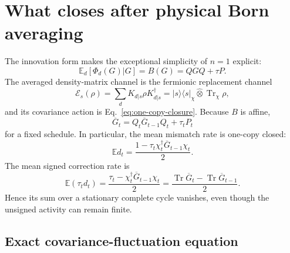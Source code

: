 \documentclass[
  aps,prx,twocolumn,superscriptaddress,longbibliography,
  nofootinbib,floatfix
]{revtex4-2}
\newcommand{\Tr}{\operatorname{Tr}}
\newcommand{\E}{\mathbb{E}}
\newcommand{\cE}{\mathcal{E}}
\newcommand{\proj}[1]{\lvert #1\rangle\!\langle #1\rvert}
\newcommand{\avg}[1]{\overline{#1}}
\theoremstyle{plain}
\theoremstyle{definition}
\begin{document}
\section{What closes after physical Born averaging}
\label{sec:mean-and-fluctuation}

The innovation form makes the exceptional simplicity of \(n=1\) explicit:
\begin{equation}
 \boxed{\E_d[\Phi_d(G)|G]=B(G)=QGQ+\tau P.}
 \label{eq:one-copy-closure}
\end{equation}
The averaged density-matrix channel is the fermionic replacement channel
\begin{equation}
 \cE_s(\rho)
 =\sum_dK_{d|s}\rho K_{d|s}^\dagger
 =\proj{s}_\chi\widehat\otimes\Tr_\chi\rho,
 \label{eq:replacement-channel}
\end{equation}
and its covariance action is Eq.~\eqref{eq:one-copy-closure}.  Because \(B\)
is affine,
\begin{equation}
 \avg G_t=Q_t\avg G_{t-1}Q_t+\tau_tP_t
 \label{eq:mean-covariance-recursion}
\end{equation}
for a fixed schedule.  In particular, the mean mismatch rate is one-copy
closed:
\begin{equation}
 \boxed{
 \E d_t
 =\frac{1-\tau_t\chi_t^\dagger\avg G_{t-1}\chi_t}{2}.}
 \label{eq:mean-defect-rate}
\end{equation}
The mean signed correction rate is
\begin{equation}
 \E(\tau_td_t)
 =\frac{\tau_t-\chi_t^\dagger\avg G_{t-1}\chi_t}{2}
 =\frac{\Tr\avg G_t-\Tr\avg G_{t-1}}{2}.
 \label{eq:mean-signed-rate}
\end{equation}
Hence its sum over a stationary complete cycle vanishes, even though the
unsigned activity can remain finite.

\subsection{Exact covariance-fluctuation equation}
\end{document}
